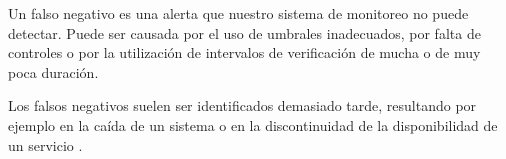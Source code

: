 Un falso negativo es una alerta que nuestro sistema de monitoreo no puede
detectar. Puede ser causada por el uso de umbrales inadecuados, por falta de
controles o por la utilización de intervalos de verificación de mucha o de muy
poca duración.

Los falsos negativos suelen ser identificados demasiado tarde, resultando por
ejemplo en la caída de un sistema o en la discontinuidad de la disponibilidad
de un servicio \cite[p.~16]{monitoreo:monitoring_with_grapfite}.

